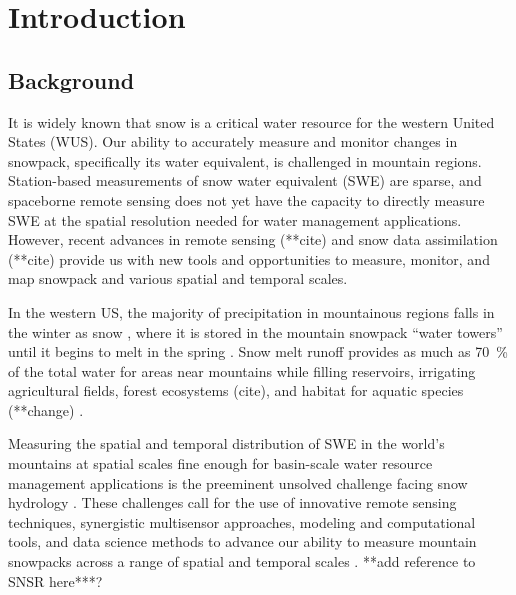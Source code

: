
\hypertarget{ch1}{%
\chapter{Introduction}\label{ch1}}
\hypertarget{ch1-intro-2}{\section{Background}\label{ch1-intro-2}}

It is widely known that snow is a critical water resource for the western United States (WUS). Our ability to accurately measure and monitor changes in snowpack, specifically its water equivalent, is challenged in mountain regions. 
Station-based measurements of snow water equivalent (SWE) are sparse, and spaceborne remote sensing does not yet have the capacity to directly measure SWE at the spatial resolution needed for water management applications. However, recent advances in remote sensing (**cite) and snow data assimilation (**cite) provide us with new tools and opportunities to measure, monitor, and map snowpack and various spatial and temporal scales.

In the western US, the majority of precipitation in mountainous regions falls in the winter as snow \citep{serrezeCharacteristicsWesternUnited1999}, where it is stored in the mountain snowpack “water towers” until it begins to melt in the spring \citep{immerzeelImportanceVulnerabilityWorld2020,viviroliIncreasingDependenceLowland2020}. Snow melt runoff provides as much as 70~\% of the total water for areas near mountains \citep{liHowMuchRunoff2017} while filling reservoirs, irrigating agricultural fields, forest ecosystems (cite), and habitat for aquatic species (**change) \citep{yarnellEcologyManagementSpring2010}. 

Measuring the spatial and temporal distribution of SWE in the world’s mountains at spatial scales fine enough for basin-scale water resource management applications is the preeminent unsolved challenge facing snow hydrology \citep{lettenmaierInroadsRemoteSensing2015, dozierEstimatingSpatialDistribution2016}. These challenges call for the use of innovative remote sensing techniques, synergistic multisensor approaches, modeling and computational tools, and data science methods to advance our ability to measure mountain snowpacks across a range of spatial and temporal scales \citep{dozierMountainHydrologySnow2011}. 
**add reference to SNSR here***?

